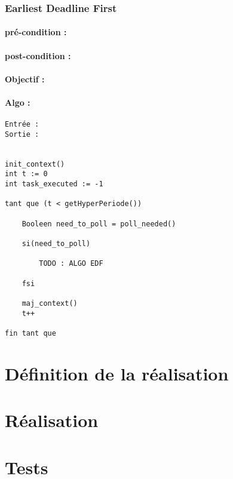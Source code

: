 					
			\subsubsection{Earliest Deadline First}
			
				\paragraph{pré-condition :} 
				\paragraph{post-condition :} 
				\paragraph{Objectif :} 
				\paragraph{Algo :} 
					\begin{verbatim}
Entrée : 
Sortie :  


init_context()
int t := 0
int task_executed := -1

tant que (t < getHyperPeriode())
	
	Booleen need_to_poll = poll_needed()
	
	si(need_to_poll)
		
		TODO : ALGO EDF
		
	fsi
	
	maj_context()
	t++
	
fin tant que
					\end{verbatim}
				

	\section{Définition de la réalisation}

	\section{Réalisation}

	\section{Tests}

